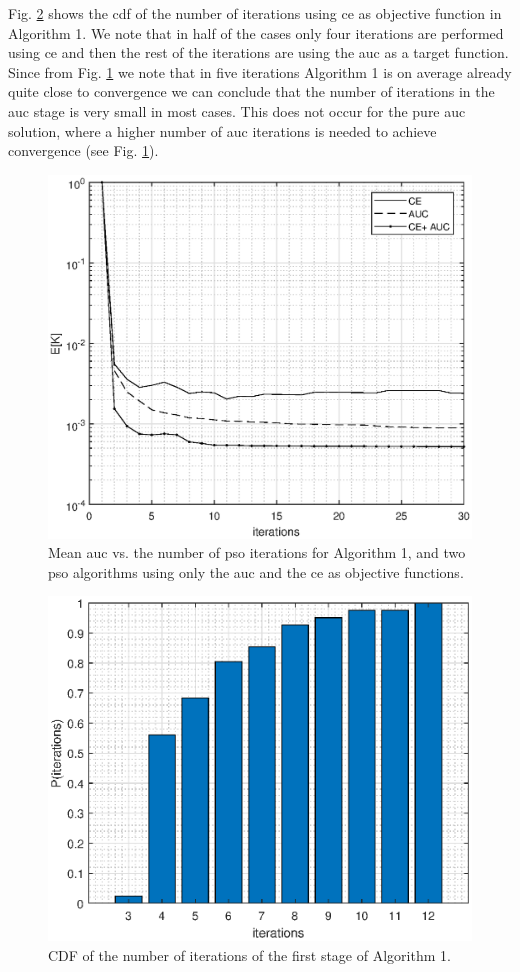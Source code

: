 \documentclass[conference,draftcls,onecolumn]{IEEEtran}
\begin{document}
 
Fig. \ref{fig:cdf} shows the \ac{cdf} of the number of  iterations using \ac{ce} as objective function in Algorithm 1. We note that in half of the cases only four iterations are performed using \ac{ce} and then the rest of the iterations are using the \ac{auc} as a target function. Since from Fig. \ref{fig:CEvsAUC} we note that in five  iterations Algorithm 1 is on average already quite close to convergence we can conclude that the number of iterations in the \ac{auc} stage is very small in most cases. This does not occur for the pure \ac{auc} solution, where a higher number of \ac{auc} iterations is needed to achieve convergence (see  Fig. \ref{fig:CEvsAUC}).
\begin{figure} 
    \centering
    \includegraphics[width=0.9\columnwidth]{CE_vsAUC.eps}
    \caption{Mean \ac{auc} vs. the number of \ac{pso} iterations for Algorithm 1, and two \ac{pso} algorithms using only the  \ac{auc} and the \ac{ce} as objective functions. }
    \label{fig:CEvsAUC}
\end{figure}

\begin{figure} 
    \centering
    \includegraphics[width=0.9\columnwidth]{cdf_bar.eps}
    \caption{CDF of the number of iterations of the first stage of Algorithm 1. }
    \label{fig:cdf}
\end{figure}
 
\end{document}
